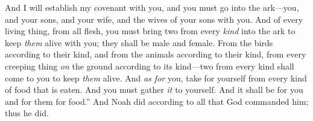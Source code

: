 \begin{biblechapter}
\verse And I will establish my covenant with you, and you must go into the ark—you, and your sons, and your wife, and the wives of your sons with you.
\verse And of every living thing, from all flesh, you must bring two from every \textit{kind} into the ark to keep \textit{them} alive with you; they shall be male and female.
\verse From the birds according to their kind, and from the animals according to their kind, from every creeping thing \textit{on} the ground according to its kind—two from every kind shall come to you to keep \textit{them} alive.
\verse And \textit{as for} you, take for yourself from every kind of food that is eaten. And you must gather \textit{it} to yourself. And it shall be for you and for them for food.”
\verse And Noah did according to all that God commanded him; thus he did.
\end{biblechapter}

